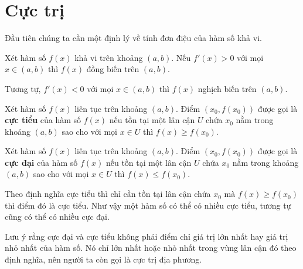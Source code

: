 \section{Cực trị}

Đầu tiên chúng ta cần một định lý về tính đơn điệu của hàm số
khả vi.

\begin{theorem}
    Xét hàm số $f(x)$ khả vi trên khoảng $(a, b)$. Nếu $f'(x) > 0$ 
    với mọi $x \in (a, b)$ thì $f(x)$ đồng biến trên $(a, b)$.
\end{theorem}

Tương tự, $f'(x) < 0$ với mọi $x \in (a, b)$ thì $f(x)$ nghịch biến trên
$(a, b)$.

\begin{definition}
    Xét hàm số $f(x)$ liên tục trên khoảng $(a, b)$. Điểm $(x_0, f(x_0))$ được
    gọi là \textbf{cực tiểu} của hàm số $f(x)$ nếu tồn tại một lân cận $U$
    chứa $x_0$ nằm trong khoảng $(a, b)$ sao cho với mọi $x \in U$ thì $f(x) \geq f(x_0)$.
\end{definition}

\begin{definition}
    Xét hàm số $f(x)$ liên tục trên khoảng $(a, b)$. Điểm $(x_0, f(x_0))$ được
    gọi là \textbf{cực đại} của hàm số $f(x)$ nếu tồn tại một lân cận $U$
    chứa $x_0$ nằm trong khoảng $(a, b)$ sao cho với mọi $x \in U$ thì $f(x) \leq f(x_0)$.
\end{definition}

Theo định nghĩa cực tiểu thì chỉ cần tồn tại lân cận chứa $x_0$
mà $f(x) \geq f(x_0)$ thì điểm đó là cực tiểu. Như vậy một hàm số có 
thể có nhiều cực tiểu, tương tự cũng có thể có nhiều cực đại.

Lưu ý rằng cực đại và cực tiểu không phải điểm chỉ giá trị lớn nhất
hay giá trị nhỏ nhất của hàm số. Nó chỉ lớn nhất hoặc nhỏ nhất trong
vùng lân cận đó theo định nghĩa, nên người ta còn gọi là cực trị địa phương.



